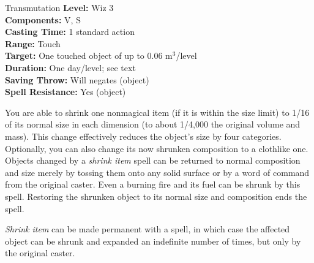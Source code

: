 {Transmutation}
{
	\textbf{Level:}
	Wiz 3\\
	\textbf{Components:}
	V, S\\
	\textbf{Casting Time:}
	1 standard action\\
	\textbf{Range:}
	Touch\\
	\textbf{Target:}
	One touched object of up to 0.06 m$^3$/level\\
	\textbf{Duration:}
	One day/level; see text\\
	\textbf{Saving Throw:}
	Will negates (object)\\
	\textbf{Spell Resistance:}
	Yes (object)\\
}
{
	You are able to shrink one nonmagical item (if it is within the size limit) to 1/16 of its normal size in each dimension (to about 1/4,000 the original volume and mass). This change effectively reduces the object's size by four categories. Optionally, you can also change its now shrunken composition to a clothlike one. Objects changed by a \emph{shrink item} spell can be returned to normal composition and size merely by tossing them onto any solid surface or by a word of command from the original caster. Even a burning fire and its fuel can be shrunk by this spell. Restoring the shrunken object to its normal size and composition ends the spell.

	\emph{Shrink item} can be made permanent with a  spell, in which case the affected object can be shrunk and expanded an indefinite number of times, but only by the original caster.

}
